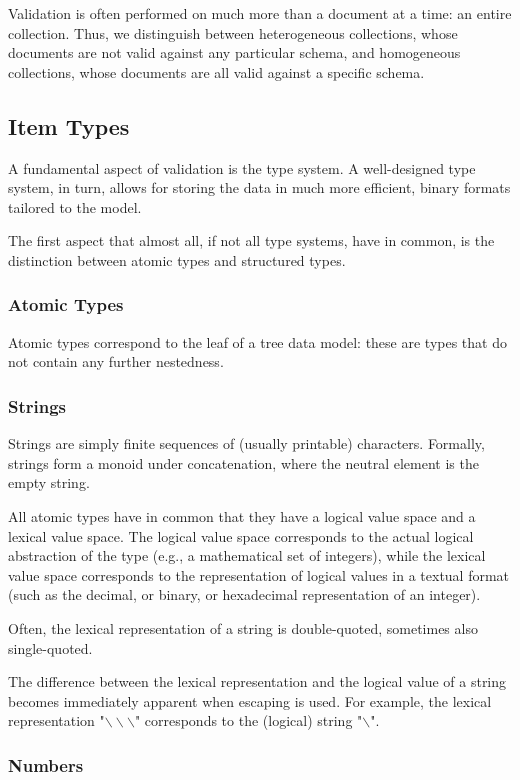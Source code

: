 Validation is often performed on much more than a document at a time: an entire collection. Thus, we distinguish between heterogeneous collections, whose documents are not valid against any particular schema, and homogeneous collections, whose documents are all valid against a specific schema.

\subsection{Item Types}
A fundamental aspect of validation is the type system. A well-designed type system, in turn, allows for storing the data in much more efficient, binary formats tailored to the model.

The first aspect that almost all, if not all type systems, have in common, is the distinction between atomic types and structured types.

\subsubsection{Atomic Types}
Atomic types correspond to the leaf of a tree data model: these are types that do not contain any further nestedness.

\subsubsection*{Strings}
Strings are simply finite sequences of (usually printable) characters. Formally, strings form a monoid under concatenation, where the neutral element is the empty string.

All atomic types have in common that they have a logical value space and a lexical value space. The logical value space corresponds to the actual logical abstraction of the type (e.g., a mathematical set of integers), while the lexical value space corresponds to the representation of logical values in a textual format (such as the decimal, or binary, or hexadecimal representation of an integer).

Often, the lexical representation of a string is double-quoted, sometimes also single-quoted.

The difference between the lexical representation and the logical value of a string becomes immediately apparent when escaping is used. For example, the lexical representation "$\backslash \backslash \backslash$" corresponds to the (logical) string "$\backslash$".

\subsubsection*{Numbers}


